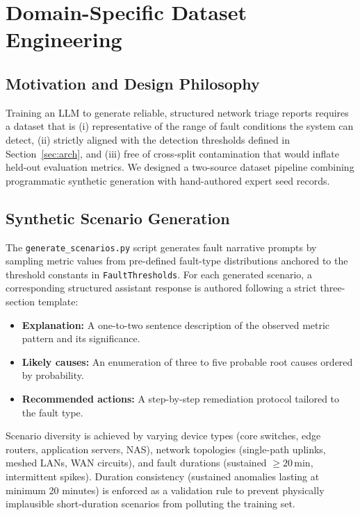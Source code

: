 \documentclass[conference]{IEEEtran}
\begin{document}
\section{Domain-Specific Dataset Engineering}
\label{sec:dataset}

\subsection{Motivation and Design Philosophy}

Training an LLM to generate reliable, structured network triage reports requires a dataset that is (i) representative of the range of fault conditions the system can detect, (ii) strictly aligned with the detection thresholds defined in Section~\ref{sec:arch}, and (iii) free of cross-split contamination that would inflate held-out evaluation metrics. We designed a two-source dataset pipeline combining programmatic synthetic generation with hand-authored expert seed records.

\subsection{Synthetic Scenario Generation}

The \texttt{generate\_scenarios.py} script generates fault narrative prompts by sampling metric values from pre-defined fault-type distributions anchored to the threshold constants in \texttt{FaultThresholds}. For each generated scenario, a corresponding structured assistant response is authored following a strict three-section template:
\begin{itemize}
    \item \textbf{Explanation:} A one-to-two sentence description of the observed metric pattern and its significance.
    \item \textbf{Likely causes:} An enumeration of three to five probable root causes ordered by probability.
    \item \textbf{Recommended actions:} A step-by-step remediation protocol tailored to the fault type.
\end{itemize}

Scenario diversity is achieved by varying device types (core switches, edge routers, application servers, NAS), network topologies (single-path uplinks, meshed LANs, WAN circuits), and fault durations (sustained $\ge 20$\,min, intermittent spikes). Duration consistency (sustained anomalies lasting at minimum 20 minutes) is enforced as a validation rule to prevent physically implausible short-duration scenarios from polluting the training set.
\end{document}
